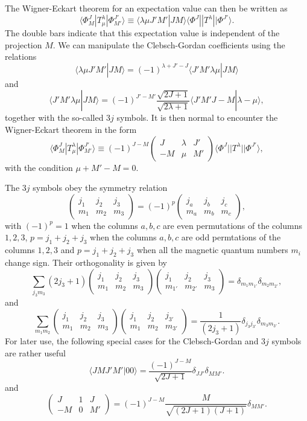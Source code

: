 {The Wigner-Eckart theorem for an expectation value can then be written as 
\[
\langle \Phi^J_M|T^{\lambda}_{\mu}|\Phi^{J'}_{M'}\rangle\equiv\langle \lambda \mu J'M'|JM\rangle\langle \Phi^J||T^{\lambda}||\Phi^{J'}\rangle.
\]
The double bars indicate that this expectation value is independent of the projection $M$.
We can manipulate the Clebsch-Gordan coefficients using the relations
\[
\langle \lambda \mu J'M'|JM\rangle= (-1)^{\lambda+J'-J}\langle J'M'\lambda \mu |JM\rangle 
\]
and 
\[
\langle J'M'\lambda \mu |JM\rangle =(-1)^{J'-M'}\frac{\sqrt{2J+1}}{\sqrt{2\lambda+1}}\langle J'M'J-M |\lambda-\mu\rangle,
\]
together with the so-called $3j$ symbols.
It is then normal to encounter the Wigner-Eckart theorem in the form 
\[
\langle \Phi^J_M|T^{\lambda}_{\mu}|\Phi^{J'}_{M'}\rangle\equiv(-1)^{J-M}\left(\begin{array}{ccc}  J & \lambda & J' \\ -M & \mu & M'\end{array}\right)\langle \Phi^J||T^{\lambda}||\Phi^{J'}\rangle,
\]
with the condition $\mu+M'-M=0$.

The $3j$ symbols obey the symmetry relation
\[
\left(\begin{array}{ccc}  j_1 & j_2 & j_3 \\ m_1 & m_2 & m_3\end{array}\right)=(-1)^{p}\left(\begin{array}{ccc}  j_a & j_b & j_c \\ m_a & m_b & m_c\end{array}\right),
\]
with $(-1)^p=1$ when the columns $a,b, c$ are even permutations of the columns $1,2,3$, $p=j_1+j_2+j_3$ when the columns $a,b,c$ are odd permtations of the
columns $1,2,3$ and $p=j_1+j_2+j_3$ when all the magnetic quantum numbers $m_i$ change sign. Their orthogonality is given by
\[
\sum_{j_3m_3}(2j_3+1)\left(\begin{array}{ccc}  j_1 & j_2 & j_3 \\ m_1 & m_2 & m_3\end{array}\right)\left(\begin{array}{ccc}  j_1 & j_2 & j_3 \\ m_{1'} & m_{2'} & m_3\end{array}\right)=\delta_{m_1m_{1'}}\delta_{m_2m_{2'}},
\]
and 
\[
\sum_{m_1m_2}\left(\begin{array}{ccc}  j_1 & j_2 & j_3 \\ m_1 & m_2 & m_3\end{array}\right)\left(\begin{array}{ccc}  j_1 & j_2 & j_{3'} \\ m_{1} & m_{2} & m_{3'}\end{array}\right)=\frac{1}{(2j_3+1)}\delta_{j_3j_{3'}}\delta_{m_3m_{3'}}.
\]
For later use, the following special cases for the Clebsch-Gordan and $3j$ symbols are rather useful
\[
\langle JM J'M' |00\rangle =\frac{(-1)^{J-M}}{\sqrt{2J+1}}\delta_{JJ'}\delta_{MM'}.
\] 
and 
\[
\left(\begin{array}{ccc}  J & 1 & J \\ -M & 0 & M'\end{array}\right)=(-1)^{J-M}\frac{M}{\sqrt{(2J+1)(J+1)}}\delta_{MM'}.
\]

}
